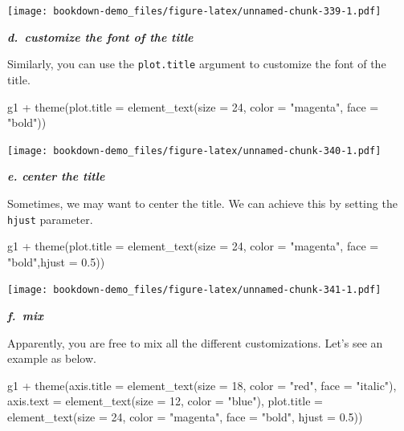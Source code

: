 \documentclass[
]{book}
\newenvironment{Shaded}{\begin{snugshade}}{\end{snugshade}}
\newcommand{\AttributeTok}[1]{\textcolor[rgb]{0.77,0.63,0.00}{#1}}
\newcommand{\DecValTok}[1]{\textcolor[rgb]{0.00,0.00,0.81}{#1}}
\newcommand{\FloatTok}[1]{\textcolor[rgb]{0.00,0.00,0.81}{#1}}
\newcommand{\FunctionTok}[1]{\textcolor[rgb]{0.00,0.00,0.00}{#1}}
\newcommand{\NormalTok}[1]{#1}
\newcommand{\SpecialCharTok}[1]{\textcolor[rgb]{0.00,0.00,0.00}{#1}}
\newcommand{\StringTok}[1]{\textcolor[rgb]{0.31,0.60,0.02}{#1}}
\begin{document}
\texttt{[image: bookdown-demo\_files/figure-latex/unnamed-chunk-339-1.pdf]}

\textbf{\emph{d.~customize the font of the title}}

Similarly, you can use the \texttt{plot.title} argument to customize the font of the title.

\begin{Shaded}
\begin{Highlighting}[]
\NormalTok{g1 }\SpecialCharTok{+} \FunctionTok{theme}\NormalTok{(}\AttributeTok{plot.title =} \FunctionTok{element\_text}\NormalTok{(}\AttributeTok{size =} \DecValTok{24}\NormalTok{, }\AttributeTok{color =} \StringTok{"magenta"}\NormalTok{, }\AttributeTok{face =} \StringTok{"bold"}\NormalTok{))}
\end{Highlighting}
\end{Shaded}

\texttt{[image: bookdown-demo\_files/figure-latex/unnamed-chunk-340-1.pdf]}

\textbf{\emph{e. center the title}}

Sometimes, we may want to center the title. We can achieve this by setting the \texttt{hjust} parameter.

\begin{Shaded}
\begin{Highlighting}[]
\NormalTok{g1 }\SpecialCharTok{+} \FunctionTok{theme}\NormalTok{(}\AttributeTok{plot.title =} \FunctionTok{element\_text}\NormalTok{(}\AttributeTok{size =} \DecValTok{24}\NormalTok{, }\AttributeTok{color =} \StringTok{"magenta"}\NormalTok{, }\AttributeTok{face =} \StringTok{"bold"}\NormalTok{,}\AttributeTok{hjust =} \FloatTok{0.5}\NormalTok{)) }
\end{Highlighting}
\end{Shaded}

\texttt{[image: bookdown-demo\_files/figure-latex/unnamed-chunk-341-1.pdf]}

\textbf{\emph{f.~mix}}

Apparently, you are free to mix all the different customizations. Let's see an example as below.

\begin{Shaded}
\begin{Highlighting}[]
\NormalTok{g1 }\SpecialCharTok{+} \FunctionTok{theme}\NormalTok{(}\AttributeTok{axis.title =} \FunctionTok{element\_text}\NormalTok{(}\AttributeTok{size =} \DecValTok{18}\NormalTok{, }\AttributeTok{color =} \StringTok{"red"}\NormalTok{, }\AttributeTok{face =} \StringTok{"italic"}\NormalTok{), }\AttributeTok{axis.text =} \FunctionTok{element\_text}\NormalTok{(}\AttributeTok{size =} \DecValTok{12}\NormalTok{, }\AttributeTok{color =} \StringTok{"blue"}\NormalTok{), }\AttributeTok{plot.title =} \FunctionTok{element\_text}\NormalTok{(}\AttributeTok{size =} \DecValTok{24}\NormalTok{, }\AttributeTok{color =} \StringTok{"magenta"}\NormalTok{, }\AttributeTok{face =} \StringTok{"bold"}\NormalTok{, }\AttributeTok{hjust =} \FloatTok{0.5}\NormalTok{))}
\end{Highlighting}
\end{Shaded}
\end{document}
